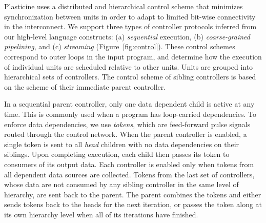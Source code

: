 
Plasticine uses a distributed and hierarchical control scheme that minimizes synchronization
between units in order to adapt to limited bit-wise connectivity in the interconnect. We support 
three types of controller protocols inferred from our high-level language constructs: (a) \emph{sequential} execution,
(b) \emph{coarse-grained pipelining}, and (c) \emph{streaming} (Figure~\ref{fig:control}).
These control schemes correspond to outer
loops in the input program, and determine how the execution of individual units are scheduled
relative to other units. Units are grouped into hierarchical sets of controllers. The control
scheme of sibling controllers is based on the scheme of their immediate parent controller.

In a sequential parent controller, only one data dependent child is active at any time.
This is commonly used when a program has loop-carried dependencies. To enforce data dependencies, we use
\emph{tokens}, which are feed-forward pulse signals routed through the control network. When the parent
controller is enabled, a single token is sent to all \emph{head} children with no data dependencies on their siblings. Upon
completing execution, each child then passes its token to consumers of its output data. Each
controller is enabled only when tokens from all dependent data sources are collected. 
Tokens from the last
set of controllers, whose data are not consumed by any sibling controller in the same level of hierarchy, are
sent back to the parent. The parent combines the tokens and either sends tokens back
to the heads for the next iteration, or passes the token along at its own hierarchy level when all
of its iterations have finished. 

